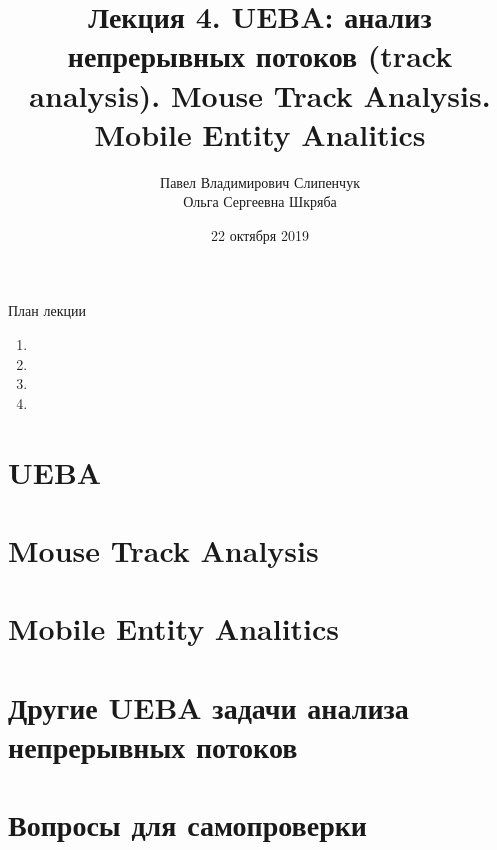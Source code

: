 


\title{Лекция 4. UEBA: анализ непрерывных потоков (track analysis). Mouse Track Analysis. Mobile Entity Analitics}

\date{22 октября 2019}
\author{Павел Владимирович Слипенчук \\ Ольга Сергеевна Шкряба}


  \maketitle
    
\begin{frame}{План лекции}
    \begin{enumerate}
    	\item {}
		\item {}
		\item {}
		\item {}
	\end{enumerate}
\end{frame}

\section{UEBA}\label{section:ueba}

\section{Mouse Track Analysis}\label{section:mca}


\section{Mobile Entity Analitics}\label{section:mea}

\section{Другие UEBA задачи анализа непрерывных потоков}\label{section:ueba_other}

\section{Вопросы для самопроверки}

